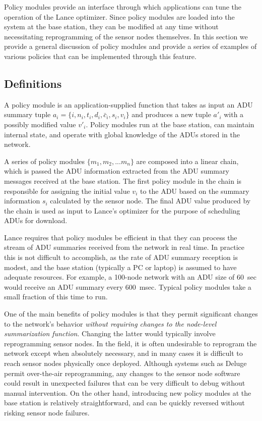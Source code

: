 \documentclass[lettersize]{sig-alternate-konrad}
\begin{document}
Policy modules provide an interface through 
which applications can tune the operation of the Lance optimizer.
Since policy modules are loaded into the system
at the base station, they can be modified at any time without 
necessitating reprogramming of the sensor nodes themselves.
In this section we provide a general discussion of policy modules and
provide a series of examples of various policies that can be implemented
through this feature. 

\subsection{Definitions}

A policy module is an application-supplied function that takes as input an
ADU summary tuple $a_i = \{ i, n_i, t_i, d_i, \bar{c}_i, s_i, v_i \}$ and
produces a new tuple $a'_i$ with a possibly modified value $v'_i$.  Policy
modules run at the base station, can maintain internal state, and operate
with global knowledge of the ADUs stored in the network. 

A series of policy modules $\{m_1, m_2, ... m_n\}$ are composed into a 
linear chain, which is passed the 
ADU information extracted from the ADU summary messages received at
the base station. The first policy module in the chain is responsible
for assigning the initial value $v_i$ to the ADU based on the summary 
information $s_i$ calculated by the sensor node. 
The final ADU value produced by the chain is used as input to 
Lance's optimizer for the purpose of scheduling ADUs for download.

Lance requires that policy modules be efficient in that
they can process the stream of ADU summaries received from the
network in real time. In practice this is not difficult to accomplish,
as the rate of ADU summary reception is modest, and the base
station (typically a PC or laptop) is assumed to have adequate
resources. For example, a 100-node network with an ADU size of 60~sec 
would receive an ADU summary every 600~msec. Typical policy modules
take a small fraction of this time to run. 

One of the main benefits of policy modules is that they permit 
significant changes to the network's behavior {\em without requiring
changes to the node-level summarization function}. Changing the
latter would typically involve reprogramming sensor nodes. 
In the field, it is often undesirable to reprogram the network 
except when absolutely necessary, and in many cases it is difficult to 
reach sensor nodes physically once deployed. Although systems such as 
Deluge~\cite{deluge} permit over-the-air reprogramming, 
any changes to the sensor node software could result in unexpected
failures that can be very difficult to debug without manual intervention. 
On the other hand, introducing new policy modules at the base station 
is relatively straightforward, and can be quickly reversed without 
risking sensor node failures. 
\end{document}
